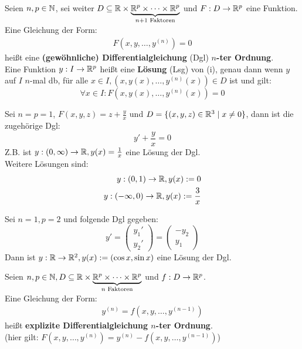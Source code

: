 \documentclass[a4paper,twoside,DIV15,BCOR12mm,chapterprefix=true,headings=twolinechapter]{scrbook}
\begin{document}
\begin{definition}
Seien $n,p\in\mathbb{N}$, sei weiter 
$D\subseteq\mathbb{R}\times\underbrace{\mathbb{R}^p\times\cdots\times\mathbb{R}^p}_{n+1 \text{ Faktoren}}$
und $F:D\to\mathbb{R}^p$ eine Funktion.\\
Eine Gleichung der Form:
\begin{align*}
F(x,y,\ldots,y^{(n)})=0 \tag{i}
\end{align*}
heißt eine \textbf{(gewöhnliche) Differentialgleichung} (Dgl) \textbf{$n$-ter Ordnung}.\\
Eine Funktion $y:I\to\mathbb{R}^p$ heißt eine \textbf{Lösung} (Lsg) von (i), genau dann wenn
$y$ auf $I$ $n$-mal db, für alle $x\in I, (x,y(x),\ldots,y^{(n)}(x))\in D$ ist und gilt:
\[\forall x\in I: F(x,y(x),\ldots,y^{(n)}(x))=0\] 
\end{definition}

\begin{beispiele}
\item Sei $n=p=1$, $F(x,y,z)=z+\frac yx$ und $D=\{(x,y,z)\in\mathbb{R}^3\mid x\ne 0\}$, dann ist die
zugehörige Dgl:
\[y'+\frac yx =0\]
Z.B. ist $y:(0,\infty)\to\mathbb{R}, y(x)=\frac1x$ eine Lösung der Dgl.\\
Weitere Lösungen sind:
\begin{align*}
y:(0,1)\to\mathbb{R},y(x):=0\\
y:(-\infty,0)\to\mathbb{R},y(x):=\frac3x
\end{align*}
\item Sei $n=1,p=2$ und folgende Dgl gegeben:
\[y'=\begin{pmatrix}y_1'\\y_2'\end{pmatrix}=\begin{pmatrix}-y_2\\y_1\end{pmatrix}\]
Dann ist $y:\mathbb{R}\to\mathbb{R}^2, y(x):=(\cos x,\sin x)$ eine Lösung der Dgl.
\end{beispiele}

\begin{definition}
Seien $n,p\in\mathbb{N}, D\subseteq \mathbb{R}\times\underbrace{\mathbb{R}^p\times\cdots\times\mathbb{R}^p}_{n \text{ Faktoren}}$
und $f:D\to\mathbb{R}^p$.\\
Eine Gleichung der Form:
\begin{align*}
y^{(n)}=f(x,y,\ldots,y^{(n-1)})\tag{ii}
\end{align*}
heißt \textbf{explizite Differentialgleichung $n$-ter Ordnung}.\\
(hier gilt: $F(x,y,\ldots,y^{(n)})=y^{(n)}-f(x,y,\ldots,y^{(n-1)})$)
\end{definition}
\end{document}
